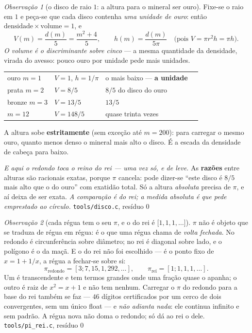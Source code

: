 \documentclass[11pt]{article}
\newcommand{\code}[1]{\texttt{\small #1}}
\theoremstyle{plain}
\theoremstyle{remark}
\newtheorem{obs}{Observação}
\begin{document}
\begin{obs}[o disco de raio $1$: a altura para o mineral ser ouro]\label{obs:disco}
Fixe-se o raio em $1$ e peça-se que cada disco contenha \emph{uma unidade de ouro}: então
$\text{densidade}\times\text{volume}=1$, e
\[
 V(m)=\frac{d(m)}{5}=\frac{m^2+4}{5},\qquad h(m)=\frac{d(m)}{5\pi}
 \quad\text{(pois } V=\pi r^2h=\pi h\text{)}.
\]
\emph{O volume é o discriminante sobre cinco} --- a mesma quantidade da densidade, virada do
avesso: pouco ouro por unidade pede mais unidades.
\begin{center}
\begin{tabular}{llll}
\toprule
ouro $m{=}1$ & $V=1$, $h=1/\pi$ & o mais baixo --- \textbf{a unidade} &\\
prata $m{=}2$ & $V=8/5$ & $8/5$ do disco do ouro &\\
bronze $m{=}3$ & $V=13/5$ & $13/5$ &\\
$m{=}12$ & $V=148/5$ & quase trinta vezes &\\
\bottomrule
\end{tabular}
\end{center}
A altura sobe \textbf{estritamente} (sem exceção até $m=200$): para carregar o mesmo ouro, quanto
menos denso o mineral mais alto o disco. É a escada da densidade de cabeça para baixo.

\emph{E aqui o redondo toca o reino do rei --- uma vez só, e de leve.} As \textbf{razões} entre
alturas são racionais exatas, porque $\pi$ cancela: pode dizer-se ``este disco é $8/5$ mais alto
que o do ouro'' com exatidão total. Só a altura \emph{absoluta} precisa de $\pi$, e aí deixa de ser
exata. \emph{A comparação é do rei; a medida absoluta é que pede emprestado ao círculo.}
\hfill{\small\code{tools/disco.c}, resíduo $0$}
\end{obs}

\begin{obs}[cada régua tem o seu $\pi$, e o do rei é $[1,1,1,\dots{]}$]\label{obs:pirei}
$\pi$ não é objeto que se traduza de régua em régua: é o que uma régua chama de \emph{volta
fechada}. No redondo é circunferência sobre diâmetro; no rei é diagonal sobre lado, e o polígono é o
da maçã. E o do rei não foi escolhido --- é o ponto fixo de $x=1+1/x$, a régua a fechar-se sobre si:
\[
 \pi_{\text{redondo}}=[3;7,15,1,292,\dots],\qquad
 \pi_{\text{rei}}=[1;1,1,1,\dots].
\]
Um é transcendente e tem termos grandes onde uma fração quase o apanha; o outro é raiz de
$x^2=x+1$ e não tem nenhum. Carregar o $\pi$ do redondo para a base do rei também se faz --- $46$
dígitos certificados por um cerco de dois convergentes, sem um único float --- e \emph{não adianta
nada}: ele continua infinito e sem padrão. A régua nova não doma o redondo; só dá ao rei o dele.
\hfill{\small\code{tools/pi\_rei.c}, resíduo $0$}
\end{obs}
\end{document}
